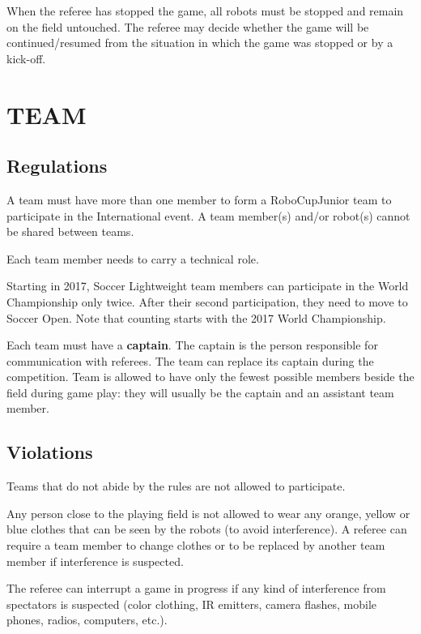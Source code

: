 \documentclass{article}
\begin{document}
When the referee has stopped the game, all robots must be stopped and remain on
the field untouched. The referee may decide whether the game will be
continued/resumed from the situation in which the game was stopped or by a
kick-off.

\section{TEAM \label{ref-015}}

\subsection{Regulations \label{ref-016}}

A team must have more than one member to form a RoboCupJunior team to
participate in the International event. A team member(s) and/or robot(s) cannot
be shared between teams.


Each team member needs to carry a technical role.

Starting in 2017, Soccer Lightweight team members can participate in the World
Championship only twice. After their second participation, they need to move to
Soccer Open. Note that counting starts with the 2017 World Championship.

Each team must have a \textbf{captain}. The captain is the person responsible
for communication with referees. The team can replace its captain during the
competition. Team is allowed to have only the fewest possible members beside
the field during game play: they will usually be the captain and an assistant
team member.

\subsection{Violations \label{ref-017}}

Teams that do not abide by the rules are not allowed to participate.

Any person close to the playing field is not allowed to wear any orange, yellow
or blue clothes that can be seen by the robots (to avoid interference). A
referee can require a team member to change clothes or to be replaced by
another team member if interference is suspected.

The referee can interrupt a game in progress if any kind of interference from
spectators is suspected (color clothing, IR emitters, camera flashes, mobile
phones, radios, computers, etc.).
\end{document}
